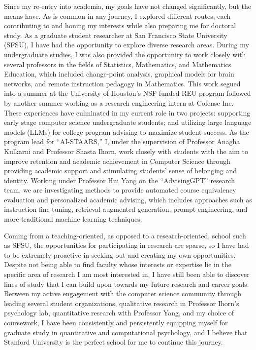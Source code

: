\documentclass[12pt]{article}
\begin{document}
Since my re-entry into academia, my goals have not changed significantly, but the means have. As is common in any journey, I explored
different routes, each contributing to and honing my interests while also preparing me for doctoral study.  As a graduate student researcher
at San Francisco State University (SFSU), I have had the opportunity to explore diverse research areas. During my undergraduate studies, I
was also provided the opportunity to work closely with several professors in the fields of Statistics, Mathematics, and Mathematics
Education, which included change-point analysis, graphical models for brain networks, and remote instruction pedagogy in Mathematics.  This
work segued into a summer at the University of Houston's NSF funded REU program followed by another summer working as a research engineering
intern at Cofense Inc.  These experiences have culminated in my current role in two projects: supporting early stage computer science
undergraduate students; and utilizing large language models (LLMs) for college program advising to maximize student success.  As the program lead
for ``AI-STAARS,'' I, under the supervision of Professor Anagha Kulkarni and Professor Shasta Ihorn, work closely with students with the aim
to improve retention and academic achievement in Computer Science through providing academic support and stimulating students' sense of
belonging and identity.  Working under Professor Hui Yang on the ``AdvisingGPT'' research team, we are investigating methods to provide
automated course equivalency evaluation and personalized academic advising, which includes approaches such as instruction fine-tuning,
retrieval-augmented generation, prompt engineering, and more traditional machine learning techniques.

Coming from a teaching-oriented, as opposed to a research-oriented, school such as SFSU, the opportunities for participating in research are
sparse, so I have had to be extremely proactive in seeking out and creating my own opportunities.  Despite not being able to find faculty
whose interests or expertise lie in the specific area of research I am most interested in, I have still been able to discover lines of study
that I can build upon towards my future research and career goals.  Between my active engagement with the computer science community through
leading several student organizations, qualitative research in Professor Ihorn's psychology lab, quantitative research with Professor Yang,
and my choice of coursework, I have been consistently and persistently equipping myself for graduate study in quantitative and computational
psychology, and I believe that Stanford University is the perfect school for me to continue this journey.
\end{document}
